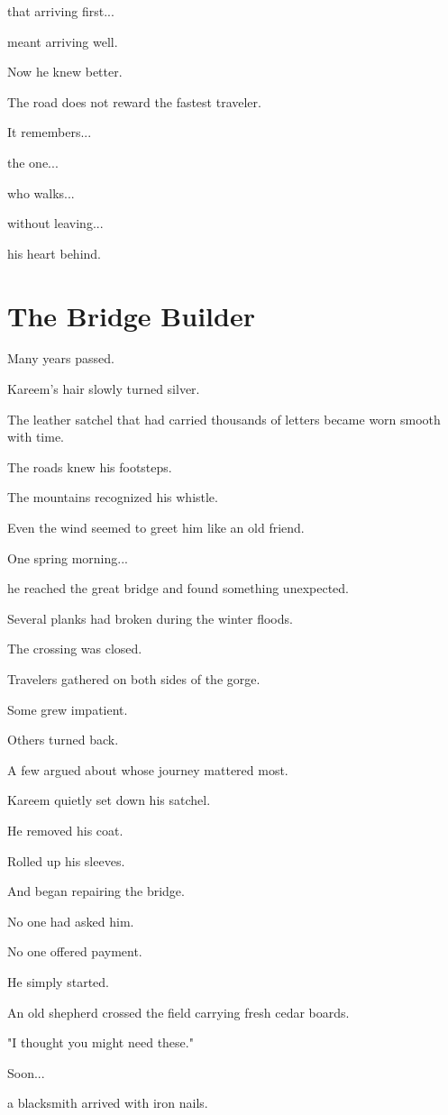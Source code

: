 \documentclass[12pt,openany]{book}
\begin{document}
that arriving first...

meant arriving well.

Now he knew better.

The road does not reward the fastest traveler.

It remembers...

the one...

who walks...

without leaving...

his heart behind.
\section*{The Bridge Builder}

Many years passed.

Kareem's hair slowly turned silver.

The leather satchel that had carried thousands of letters became worn smooth with time.

The roads knew his footsteps.

The mountains recognized his whistle.

Even the wind seemed to greet him like an old friend.

One spring morning...

he reached the great bridge and found something unexpected.

Several planks had broken during the winter floods.

The crossing was closed.

Travelers gathered on both sides of the gorge.

Some grew impatient.

Others turned back.

A few argued about whose journey mattered most.

Kareem quietly set down his satchel.

He removed his coat.

Rolled up his sleeves.

And began repairing the bridge.

No one had asked him.

No one offered payment.

He simply started.

An old shepherd crossed the field carrying fresh cedar boards.

"I thought you might need these."

Soon...

a blacksmith arrived with iron nails.
\end{document}
